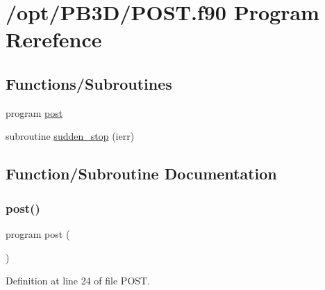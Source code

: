 \hypertarget{POST_8f90}{}\section{/opt/\+P\+B3\+D/\+P\+O\+ST.f90 Program Rerefence}
\label{POST_8f90}
\subsection*{Functions/\+Subroutines}
\begin{DoxyCompactItemize}
\item 
program \hyperlink{POST_8f90_ac289b64ac4671fea0b4f2298ba1188a1}{post}
\item 
subroutine \hyperlink{POST_8f90_aaee67c546b34b4095587a626df7b98c2}{sudden\+\_\+stop} (ierr)
\end{DoxyCompactItemize}


\subsection{Function/\+Subroutine Documentation}
\mbox{\label{POST_8f90_ac289b64ac4671fea0b4f2298ba1188a1}} 
\subsubsection{\texorpdfstring{post()}{post()}}
{\footnotesize\ttfamily program post (\begin{DoxyParamCaption}{ }\end{DoxyParamCaption})}



Definition at line 24 of file P\+O\+S\+T.

